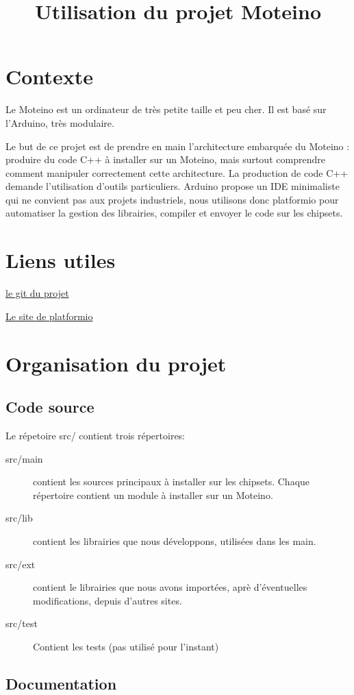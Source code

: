 \documentclass{report}
\title{Utilisation du projet Moteino}
\begin{document}
\chapter{Contexte}

Le Moteino est un ordinateur de très petite taille et peu cher. Il est basé sur l'Arduino, très modulaire. 

Le but de ce projet est de prendre en main l'architecture embarquée du Moteino : produire du code C++ à installer sur un Moteino, mais surtout comprendre comment manipuler correctement cette architecture.
La production de code C++ demande l'utilisation d'outils particuliers. Arduino propose un IDE minimaliste qui ne convient pas aux projets industriels, nous utilisons donc platformio pour automatiser la gestion des librairies, compiler et envoyer le code sur les chipsets.

\chapter{Liens utiles}

\href{https://github.com/glelouet/Moteino}{le git du projet}

\href{http://platformio.org/}{Le site de platformio}

\chapter{Organisation du projet}

\section{Code source}

Le répetoire src/ contient trois répertoires:
\begin{description}
\item[src/main] contient les sources principaux à installer sur les chipsets. Chaque répertoire contient un module à installer sur un Moteino.
\item[src/lib] contient les librairies que nous développons, utilisées dans les main.
\item[src/ext] contient le librairies que nous avons importées, aprè d'éventuelles modifications, depuis d'autres sites.
\item[src/test] Contient les tests (pas utilisé pour l'instant)
\end{description}

\section{Documentation}
\end{document}
